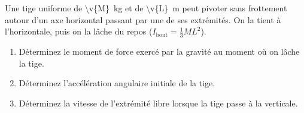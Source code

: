 Une tige uniforme de \qty{\v{M}}{kg} et de \qty{\v{L}}{m} peut pivoter sans frottement autour d'un axe horizontal passant par une de ses extrémités. On la tient à l'horizontale, puis on la lâche du repos ($I_{\text{bout}} = \tfrac{1}{3}ML^2$).

\begin{center}
\end{center}

\begin{enumerate}[label=\alph*)]
    \item Déterminez le moment de force exercé par la gravité au moment où on lâche la tige.
    \item Déterminez l'accélération angulaire initiale de la tige.
    \item Déterminez la vitesse de l'extrémité libre lorsque la tige passe à la verticale.
\end{enumerate}
